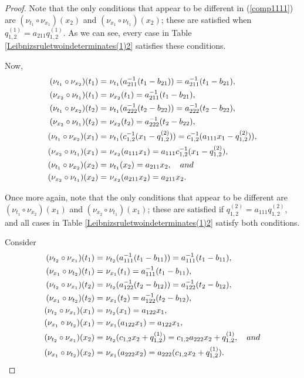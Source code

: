 \documentclass{amsart}
\theoremstyle{definition}
\theoremstyle{remark}
\numberwithin{equation}{section}
\begin{document}
\begin{proof}
Note that the only conditions that appear to be different in {\rm (}\ref{comp1111}{\rm )} are $(\nu_{t_1} \circ \nu_{x_1})(x_2)$ and $(\nu_{x_1} \circ \nu_{t_1})(x_2)$; these are satisfied when $q_{1,2}^{(1)}=a_{211}q_{1,2}^{(1)}$. As we can see, every case in Table   \ref{Leibnizsruletwoindeterminates(1)2} satisfies these conditions. 

Now, 
\begin{align}
    (\nu_{t_1} \circ \nu_{x_2})(t_1) = &\ \nu_{t_1}(a_{211}^{-1}(t_1-b_{21}))=a_{211}^{-1}(t_1-b_{21}), \notag \\
    (\nu_{x_2} \circ \nu_{t_1})(t_1) = &\ \nu_{x_2}(t_1) = a_{211}^{-1}(t_1-b_{21}), \notag \\
    (\nu_{t_1} \circ \nu_{x_2})(t_2) = &\ \nu_{t_1}(a_{222}^{-1}(t_2-b_{22}))=a_{222}^{-1}(t_2-b_{22}), \notag \\
    (\nu_{x_2} \circ \nu_{t_1})(t_2) = &\ \nu_{x_2}(t_2) = a_{222}^{-1}(t_2-b_{22}), \notag \\
    (\nu_{t_1} \circ \nu_{x_2})(x_1) = &\ \nu_{t_1}(c_{1,2}^{-1}(x_1-q_{1,2}^{(2)}))=c_{1,2}^{-1}(a_{111}x_1-q_{1,2}^{(2)})), \label{comp1221.}\\ 
    (\nu_{x_2} \circ \nu_{t_1})(x_1) = &\  \nu_{x_2}(a_{111}x_1)=a_{111}c_{1,2}^{-1}(x_1-q_{1,2}^{(2)}), \notag \\
    (\nu_{t_1} \circ \nu_{x_2})(x_2) = &\ \nu_{t_1}(x_2)=a_{211}x_2, \quad {\rm and} \notag \\  
 (\nu_{x_2} \circ \nu_{t_1})(x_2) = &\ \nu_{x_2}(a_{211}x_2)=a_{211}x_2. \notag
\end{align}

Once more again, note that the only conditions that appear to be different are $(\nu_{t_1} \circ \nu_{x_2})(x_1)$ and $(\nu_{x_2} \circ \nu_{t_1})(x_1)$; these are satisfied if $q_{1,2}^{(2)}=a_{111}q_{1,2}^{(2)}$, and all cases in Table \ref{Leibnizsruletwoindeterminates(1)2} satisfy both conditions. 

Consider 
\begin{align}
    (\nu_{t_2} \circ \nu_{x_1})(t_1) = &\ \nu_{t_2}(a_{111}^{-1}(t_1-b_{11}))=a_{111}^{-1}(t_1-b_{11}), \notag \\
    (\nu_{x_1} \circ \nu_{t_2})(t_1) = &\ \nu_{x_1}(t_1) = a_{111}^{-1}(t_1-b_{11}), \notag \\
    (\nu_{t_2} \circ \nu_{x_1})(t_2) = &\ \nu_{t_2}(a_{122}^{-1}(t_2-b_{12}))=a_{122}^{-1}(t_2-b_{12}), \notag \\
    (\nu_{x_1} \circ \nu_{t_2})(t_2) = &\ \nu_{x_1}(t_2) = a_{122}^{-1}(t_2-b_{12}), \notag \\
    (\nu_{t_2} \circ \nu_{x_1})(x_1) = &\ \nu_{t_2}(x_1)=a_{122}x_1, \label{comp2112.}\\ 
    (\nu_{x_1} \circ \nu_{t_2})(x_1) = &\  \nu_{x_1}(a_{122}x_1)=a_{122}x_1, \notag \\
    (\nu_{t_2} \circ \nu_{x_1})(x_2) = &\ \nu_{t_2}(c_{1,2}x_2+q_{1,2}^{(1)})=c_{1,2}a_{222}x_2+q_{1,2}^{(1)}, \quad {\rm and} \notag \\  
 (\nu_{x_1} \circ \nu_{t_2})(x_2) = &\ \nu_{x_1}(a_{222}x_2)=a_{222}(c_{1,2}x_2+q_{1,2}^{(1)}). \notag
\end{align}


\end{proof}
\end{document}
